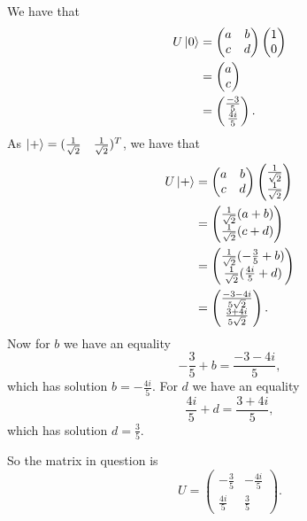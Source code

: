 \documentclass[10pt]{article}
\begin{document}
We have that
\begin{align*}
U\ket{0} &= 
\begin{pmatrix}
a & b \\
c & d
\end{pmatrix}
\begin{pmatrix}
1 \\
0
\end{pmatrix} \\
&= 
\begin{pmatrix}
a \\
c
\end{pmatrix} \\
&= 
\begin{pmatrix}
\frac{-3}{5} \\
\frac{4i}{5}
\end{pmatrix}.
\end{align*}
As $\ket{+} = (\frac{1}{\sqrt{2}} \quad \frac{1}{\sqrt{2}})^T$, we have that
\begin{align*}
U\ket{+} &= 
\begin{pmatrix}
a & b \\
c & d
\end{pmatrix}
\begin{pmatrix}
\frac{1}{\sqrt{2}} \\
\frac{1}{\sqrt{2}}
\end{pmatrix} \\
&= 
\begin{pmatrix}
\frac{1}{\sqrt{2}} (a + b) \\
\frac{1}{\sqrt{2}} (c + d) \\
\end{pmatrix} \\
&= 
\begin{pmatrix}
\frac{1}{\sqrt{2}} (-\frac{3}{5} + b) \\
\frac{1}{\sqrt{2}} (\frac{4i}{5} + d)
\end{pmatrix} \\
&=
\begin{pmatrix}
\frac{-3-4i}{5\sqrt{2}} \\
\frac{3+4i}{5\sqrt{2}}
\end{pmatrix}.
\end{align*}
Now for $b$ we have an equality
\[
-\frac{3}{5} + b = \frac{-3-4i}{5},
\]
which has solution $b = -\frac{4i}{5}$.
For $d$ we have an equality
\[
\frac{4i}{5} + d = \frac{3+4i}{5},
\]
which has solution $d = \frac{3}{5}$.

So the matrix in question is
\[
U = 
\begin{pmatrix}
-\frac{3}{5} & -\frac{4i}{5} \\
\frac{4i}{5} & \frac{3}{5}
\end{pmatrix}.
\]
\end{document}
